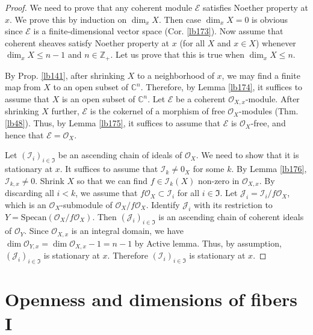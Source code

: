\documentclass[12pt,b5paper,notitlepage]{report}
\theoremstyle{definition}
\theoremstyle{plain}
\newcommand{\fk}{\mathfrak}
\newcommand{\mc}{\mathcal}
\newcommand{\scr}{\mathscr}
\newcommand{\Cbb}{\mathbb C}
\newcommand{\Zbb}{\mathbb Z}
\newcommand{\Specan}{\mathrm{Specan}}
\numberwithin{equation}{section}
\begin{document}
\begin{proof}
We need to prove that any coherent module $\scr E$ satisfies Noether property at $x$. We prove this by induction on $\dim_xX$. Then case $\dim_xX=0$ is obvious since $\scr E$ is a finite-dimensional vector space (Cor. \ref{lb173}). Now assume that coherent sheaves satisfy Noether property at $x$ (for all $X$ and $x\in X$) whenever $\dim_xX\leq n-1$ and $n\in\Zbb_+$. Let us prove that this is true when $\dim_xX\leq n$.

By Prop. \ref{lb141}, after shrinking $X$ to a neighborhood of $x$, we may find a finite map from $X$ to an open subset of $\Cbb^n$. Therefore, by Lemma \ref{lb174}, it suffices to assume that $X$ is an open subset of $\Cbb^n$. Let $\scr E$ be a coherent $\scr O_{X,x}$-module. After shrinking $X$ further, $\scr E$ is the cokernel of a morphism of free $\scr O_X$-modules (Thm. \ref{lb48}). Thus, by Lemma \ref{lb175}, it suffices to assume that $\scr E$ is $\scr O_X$-free, and hence that $\scr E=\scr O_X$.

Let $(\mc I_i)_{i\in\fk I}$ be an ascending chain of ideals of $\scr O_X$. We need to show that it is stationary at $x$. It suffices to assume that $\mc I_k\neq 0_X$ for some $k$. By Lemma \ref{lb176}, $\mc I_{k,x}\neq 0$. Shrink $X$ so that we can find $f\in\mc I_k(X)$ non-zero in $\scr O_{X,x}$. By discarding all $i<k$, we assume that $f\scr O_X\subset\mc I_i$ for all $i\in\fk I$. Let $\mc J_i=\mc I_i/f\scr O_X$, which is an $\scr O_X$-submodule of $\scr O_X/f\scr O_X$. Identify $\mc J_i$ with its restriction to $Y=\Specan(\scr O_X/f\scr O_X)$. Then $(\mc J_i)_{i\in\fk I}$ is an ascending chain of coherent ideals of $\scr O_Y$. Since $\scr O_{X,x}$ is an integral domain, we have $\dim \scr O_{Y,x}=\dim\scr O_{X,x}-1=n-1$ by Active lemma. Thus, by assumption, $(\mc J_i)_{i\in\fk I}$ is stationary at $x$. Therefore $(\mc I_i)_{i\in\fk I}$ is stationary at $x$.
\end{proof}
























\section{Openness and dimensions of fibers I}\label{lb283}
\end{document}
